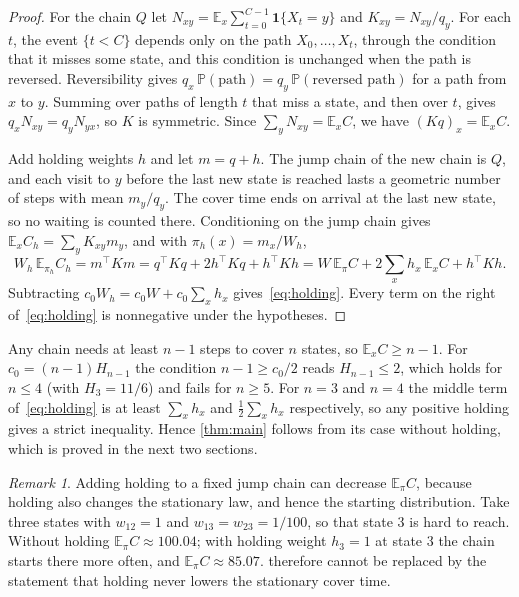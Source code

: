 \documentclass[11pt]{amsart}
\theoremstyle{remark}
\newtheorem{remark}[theorem]{Remark}
\newcommand{\E}{\mathbb{E}}
\begin{document}
\begin{proof}
For the chain $Q$ let $N_{xy}=\E_x\sum_{t=0}^{C-1}\mathbf 1\{X_t=y\}$ and $K_{xy}=N_{xy}/q_y$. For each $t$, the event
$\{t<C\}$ depends only on the path $X_0,\dots,X_t$, through the condition that it misses some state, and this condition
is unchanged when the path is reversed. Reversibility gives $q_x\,\mathbb P(\text{path})=q_y\,\mathbb P(\text{reversed
path})$ for a path from $x$ to $y$. Summing over paths of length $t$ that miss a state, and then over $t$, gives
$q_xN_{xy}=q_yN_{yx}$, so $K$ is symmetric. Since $\sum_yN_{xy}=\E_xC$, we have $(Kq)_x=\E_xC$.

Add holding weights $h$ and let $m=q+h$. The jump chain of the new chain is $Q$, and each visit to $y$ before the last
new state is reached lasts a geometric number of steps with mean $m_y/q_y$. The cover time ends on arrival at the last
new state, so no waiting is counted there. Conditioning on the jump chain gives $\E_xC_h=\sum_yK_{xy}m_y$, and with
$\pi_h(x)=m_x/W_h$,
\[
W_h\,\E_{\pi_h}C_h=m^{\top}Km=q^{\top}Kq+2h^{\top}Kq+h^{\top}Kh=W\,\E_\pi C+2\sum_xh_x\,\E_xC+h^{\top}Kh .
\]
Subtracting $c_0W_h=c_0W+c_0\sum_xh_x$ gives~\eqref{eq:holding}. Every term on the right of~\eqref{eq:holding} is
nonnegative under the hypotheses.
\end{proof}

Any chain needs at least $n-1$ steps to cover $n$ states, so $\E_xC\ge n-1$. For $c_0=(n-1)H_{n-1}$ the condition
$n-1\ge c_0/2$ reads $H_{n-1}\le2$, which holds for $n\le4$ (with $H_3=11/6$) and fails for $n\ge5$. For $n=3$ and
$n=4$ the middle term of~\eqref{eq:holding} is at least $\sum_xh_x$ and $\tfrac12\sum_xh_x$ respectively, so any
positive holding gives a strict inequality. Hence \cref{thm:main} follows from its case without holding, which is
proved in the next two sections.

\begin{remark}\label{rem:holding-lowers}
Adding holding to a fixed jump chain can decrease $\E_\pi C$, because holding also changes the stationary law, and
hence the starting distribution. Take three states with $w_{12}=1$ and $w_{13}=w_{23}=1/100$, so that state $3$ is
hard to reach. Without holding $\E_\pi C\approx100.04$; with holding weight $h_3=1$ at state $3$ the chain starts
there more often, and $\E_\pi C\approx85.07$.  therefore cannot be replaced by the statement that
holding never lowers the stationary cover time.
\end{remark}
\end{document}
